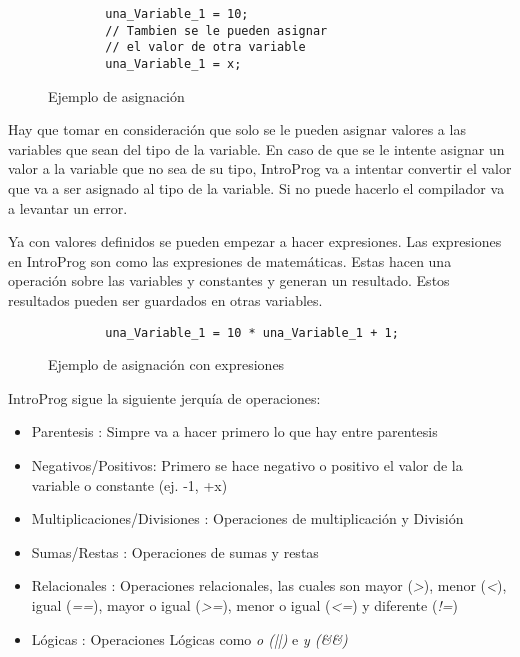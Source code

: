 \begin{figure}[!htbp]
    \centering
    
    \begin{lstlisting}
        una_Variable_1 = 10;
        // Tambien se le pueden asignar 
        // el valor de otra variable
        una_Variable_1 = x; 
    \end{lstlisting}
    \caption{Ejemplo de asignación}
\end{figure}
\FloatBarrier
Hay que tomar en consideración que solo se le pueden asignar valores a las variables que sean del tipo de la variable. En caso de que se le intente asignar un valor a la variable que no sea de su tipo, IntroProg va a intentar convertir el valor que va a ser asignado al tipo de la variable. Si no puede hacerlo el compilador va a levantar un error.

Ya con valores definidos se pueden empezar a hacer expresiones. Las expresiones en IntroProg son como las expresiones de matemáticas. Estas hacen una operación sobre las variables y constantes y generan un resultado. Estos resultados pueden ser guardados en otras variables.

\begin{figure}[!htbp]
    \centering
    
    \begin{lstlisting}
        una_Variable_1 = 10 * una_Variable_1 + 1;

    \end{lstlisting}
    \caption{Ejemplo de asignación con expresiones}
\end{figure}
\FloatBarrier

IntroProg sigue la siguiente jerquía de operaciones:
\begin{itemize}
    \item Parentesis : Simpre va a hacer primero lo que hay entre parentesis
    \item Negativos/Positivos: Primero se hace negativo o positivo el valor de la variable o constante (ej. -1, +x)
    \item Multiplicaciones/Divisiones : Operaciones de multiplicación y División
    \item Sumas/Restas : Operaciones de sumas y restas
    \item Relacionales : Operaciones relacionales, las cuales son mayor (\emph{>}), menor (\emph{<}), igual (\emph{==}), mayor o igual (\emph{>=}), menor o igual (\emph{<=}) y diferente (\emph{!=})
    \item Lógicas : Operaciones Lógicas como \emph{o (||)} e \emph{y (\&\&)}
\end{itemize}

